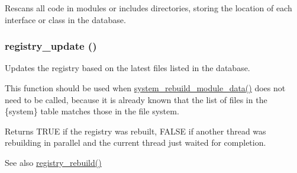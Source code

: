 Rescans all code in modules or includes directories, storing the location of each interface or class in the database. \hypertarget{group__registry_gaab1bcea9fb061684c700676aa5ebe608}{
\subsubsection[{registry\_\-update}]{\setlength{\rightskip}{0pt plus 5cm}registry\_\-update ()}}
\label{group__registry_gaab1bcea9fb061684c700676aa5ebe608}
Updates the registry based on the latest files listed in the database.

This function should be used when \hyperlink{system_8module_a2c3c848bc7c14d6f770a2f8df8f35332}{system\_\-rebuild\_\-module\_\-data()} does not need to be called, because it is already known that the list of files in the \{system\} table matches those in the file system.

\begin{DoxyReturn}{Returns}
TRUE if the registry was rebuilt, FALSE if another thread was rebuilding in parallel and the current thread just waited for completion.
\end{DoxyReturn}
\begin{DoxySeeAlso}{See also}
\hyperlink{group__registry_ga63939dbdcf7950c97292f7d341f6d339}{registry\_\-rebuild()} 
\end{DoxySeeAlso}

